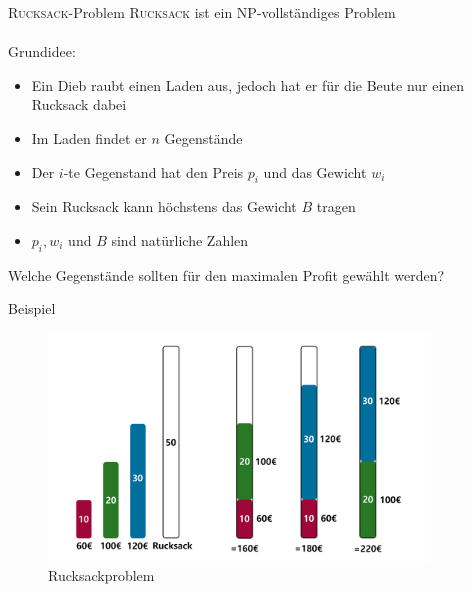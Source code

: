 \begin{frame}{\textsc{Rucksack}-Problem}
    \textsc{Rucksack} ist ein NP-vollständiges Problem \\~\\
    \pause
    Grundidee: 
    
    \begin{itemize}
        \item Ein Dieb raubt einen Laden aus, jedoch hat er für die Beute nur einen Rucksack dabei
        \item Im Laden findet er $n$ Gegenstände
        \item Der $i$-te Gegenstand hat den Preis $p_i$ und das Gewicht $w_i$
        \item Sein Rucksack kann höchstens das Gewicht $B$ tragen
        \item $p_i, w_i$ und $B$ sind natürliche Zahlen
    \end{itemize}
    \alert{Welche Gegenstände sollten für den maximalen Profit gewählt werden?} 
\end{frame}
\begin{frame}{Beispiel}
    \begin{figure}[ht]
    	\centering
    	\includegraphics[width=0.9\textwidth]{img/Rucksack.pdf}
    	\caption{Rucksackproblem}
    	\label{fig:rucksack}
    \end{figure}
\end{frame}
